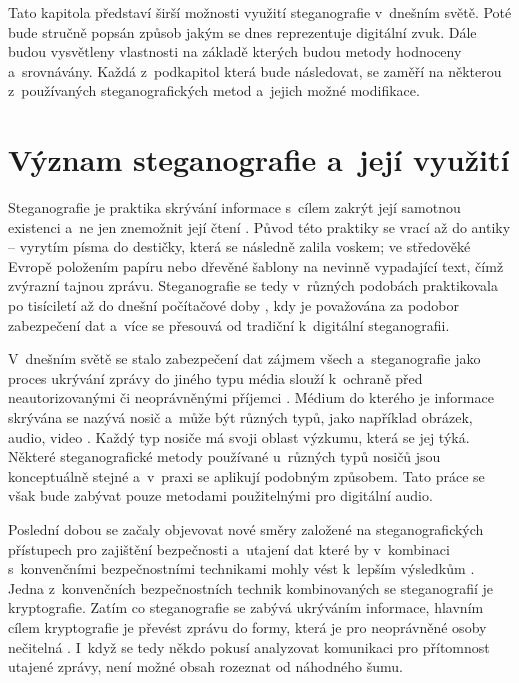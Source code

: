 Tato kapitola představí širší možnosti využití steganografie v~dnešním světě.
Poté bude stručně popsán způsob jakým se dnes reprezentuje digitální zvuk. Dále
budou vysvětleny vlastnosti na základě kterých budou metody hodnoceny
a~srovnávány. Každá z~podkapitol která bude následovat, se zaměří na některou
z~používaných steganografických metod a~jejich možné modifikace.

\section{Význam steganografie a~její využití}
\label{sec:motivation-and-uses}

Steganografie je praktika skrývání informace s~cílem zakrýt její samotnou
existenci a~ne jen znemožnit její čtení
\cite{AlSabhany2020}\cite{Anderson1998}\cite{Djebbar2012}\cite{Dutta2020}.
Původ této praktiky se vrací až do antiky -- vyrytím písma do destičky, která
se následně zalila voskem; ve středověké Evropě položením papíru nebo dřevěné
šablony na nevinně vypadající text, čímž zvýrazní tajnou zprávu. Steganografie
se tedy v~různých podobách praktikovala po tisíciletí až do dnešní počítačové
doby \cite{Anderson1998}, kdy je považována za podobor zabezpečení dat
\cite{Djebbar2012} a~více se přesouvá od tradiční k~digitální steganografii.

V~dnešním světě se stalo zabezpečení dat zájmem všech a~steganografie jako
proces ukrývání zprávy do jiného typu média slouží k~ochraně před
neautorizovanými či neoprávněnými příjemci \cite{Dutta2020}. Médium do kterého
je informace skrývána se nazývá nosič a~může být různých typů, jako například
obrázek, audio, video \cite{Dutta2020}. Každý typ nosiče má svoji oblast
výzkumu, která se jej týká. Některé steganografické metody používané u~různých
typů nosičů jsou konceptuálně stejné a~v~praxi se aplikují podobným způsobem.
Tato práce se však bude zabývat pouze metodami použitelnými pro digitální
audio.

Poslední dobou se začaly objevovat nové směry založené na steganografických
přístupech pro zajištění bezpečnosti a~utajení dat které by v~kombinaci
s~konvenčními bezpečnostními technikami mohly vést k~lepším výsledkům
\cite{Djebbar2012}. Jedna z~konvenčních bezpečnostních technik kombinovaných se
steganografií je kryptografie. Zatím co steganografie se zabývá ukrýváním
informace, hlavním cílem kryptografie je převést zprávu do formy, která je pro
neoprávněné osoby nečitelná \cite{AlSabhany2020}. I~když se tedy někdo pokusí
analyzovat komunikaci pro přítomnost utajené zprávy, není možné obsah rozeznat
od náhodného šumu.

